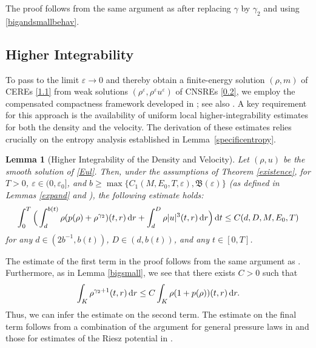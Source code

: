 \documentclass[reqno,11pt]{amsart}
\numberwithin{equation}{section}
\newtheorem{lemma}[theorem]{Lemma}
\theoremstyle{definition}
\def\v{\varepsilon}
\def\dd{{\, \rm d}}
\begin{document}
The proof follows from the same argument as \cite[Lemma 3.11]{Carrillo2025} after replacing $\gamma$ by $\gamma_2$ 
and using \eqref{bigandsmallbehav}.

\subsection{Higher Integrability}
To pass to the limit $\varepsilon \to 0$ and thereby obtain a finite-energy solution  $(\rho,m)$
of CEREs \eqref{1.1} from weak solutions $(\rho^\v,\rho^\v u^\v)$ of CNSREs \eqref{0.2}, 
we employ the compensated compactness framework developed in \cite{Chen_2024};
see also \cite{chen2009vanishing,Schrecker_2019}. 
A key requirement for this approach is the availability of uniform local higher-integrability 
estimates for both the density and the velocity. 
The derivation of these estimates relies crucially on the entropy analysis 
established in Lemma~\ref{specificentropy}.

\begin{lemma}[Higher Integrability of the Density and Velocity]\label{higher}
Let $(\rho,u)$ be the smooth solution of \eqref{Eul}. Then, under the assumptions of {\rm Theorem {\rm \ref{existence}}},
for $T>0$, $\v\in(0,\v_0]$, and $b \geq \max\{C_1(M,E_0,T,\varepsilon), \mathfrak{B}(\varepsilon)\}$
{\rm (}as defined in {\rm Lemmas \ref{expand}} and {\rm \cite[Lemma B.8]{Carrillo2025}}{\rm )},
the following estimate holds{\rm :}
    \begin{align*}
    \int^T_0 \Big( \int^{b(t)}_d \rho (p(\rho) + \rho^{\gamma_2} )(t,r) \dd r + \int^{D}_d \rho|u|^3(t,r) 
     \dd r \Big) \dd t \leq C(d,D,M,E_0,T)
    \end{align*}
for any $d \in (2b^{-1},b(t))$, $D \in (d,b(t))$, and any $t \in [0,T]$. 
\end{lemma}
The estimate of the first term in the proof follows from the same argument 
as \cite[Lemma 3.12]{Carrillo2025}. 
Furthermore, as in Lemma \ref{bigsmall}, we see that there exists $C>0$ such that
\[
    \int_K \rho^{\gamma_2 + 1}(t,r) \dd r \leq C \int_K \rho(1 + p(\rho))(t,r) \dd r.
\]
Thus, we can infer the estimate on the second term. 
The estimate on the final term follows from a combination of the argument 
for general pressure laws in \cite[Lemma 5.6]{Chen_2024} 
and those for estimates of the Riesz potential in \cite[Lemma 3.13]{Carrillo2025}.
\end{document}
